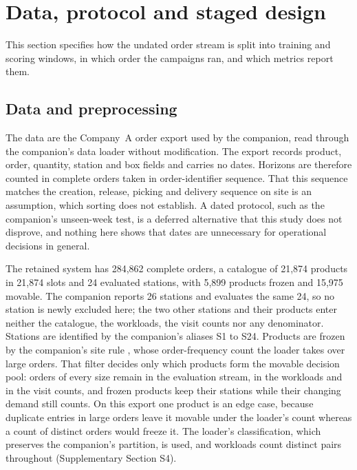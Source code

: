 \section{Data, protocol and staged design}\label{sec:protocol}
This section specifies how the undated order stream is split into training and scoring windows, in which order the campaigns ran, and which metrics report them.

\subsection{Data and preprocessing}\label{subsec:data}
The data are the Company~A order export used by the companion, read through the companion's data loader without modification. The export records product, order, quantity, station and box fields and carries no dates. Horizons are therefore counted in complete orders taken in order-identifier sequence. That this sequence matches the creation, release, picking and delivery sequence on site is an assumption, which sorting does not establish. A dated protocol, such as the companion's unseen-week test, is a deferred alternative that this study does not disprove, and nothing here shows that dates are unnecessary for operational decisions in general. %

The retained system has 284,862 complete orders, a catalogue of 21,874 products in 21,874 slots and 24 evaluated stations, with 5,899 products frozen and 15,975 movable. The companion reports 26 stations and evaluates the same 24, so no station is newly excluded here; the two other stations and their products enter neither the catalogue, the workloads, the visit counts nor any denominator. Stations are identified by the companion's aliases S1 to S24. Products are frozen by the companion's site rule \citep[Supplementary Section S6]{belul_companion}, whose order-frequency count the loader takes over large orders. That filter decides only which products form the movable decision pool: orders of every size remain in the evaluation stream, in the workloads and in the visit counts, and frozen products keep their stations while their changing demand still counts. On this export one product is an edge case, because duplicate entries in large orders leave it movable under the loader's count whereas a count of distinct orders would freeze it. The loader's classification, which preserves the companion's partition, is used, and workloads count distinct pairs throughout (Supplementary Section S4).

